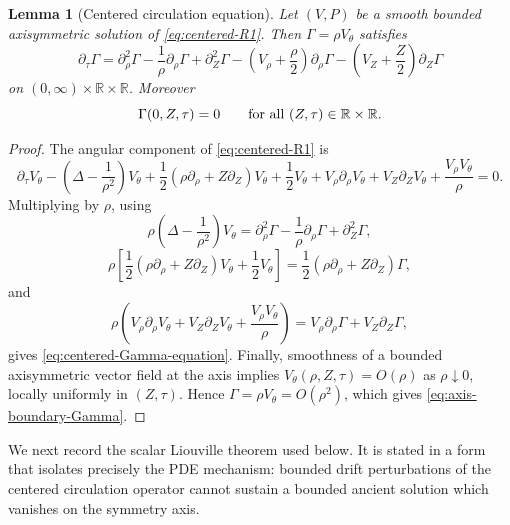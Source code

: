 \documentclass[11pt]{amsart}
\numberwithin{equation}{section}
\theoremstyle{plain}
\newtheorem{lemma}[lemma]{Lemma}
\theoremstyle{definition}
\theoremstyle{remark}
\begin{document}
\begin{lemma}[Centered circulation equation]\label{lem:centered-circulation-equation}
Let \((V,P)\) be a smooth bounded axisymmetric solution of
\eqref{eq:centered-R1}.  Then \(\Gamma=\rho V_\theta\) satisfies
\begin{equation}\label{eq:centered-Gamma-equation}
   \partial_\tau\Gamma
   =
   \partial_\rho^2\Gamma-\frac1\rho\partial_\rho\Gamma
      +\partial_Z^2\Gamma
   -\left(V_\rho+\frac\rho2\right)\partial_\rho\Gamma
   -\left(V_Z+\frac Z2\right)\partial_Z\Gamma
\end{equation}
on \((0,\infty)\times\mathbb R\times\mathbb R\).  Moreover
\begin{equation}\label{eq:axis-boundary-Gamma}
   \Gamma(0,Z,\tau)=0
   \qquad\hbox{for all }(Z,\tau)\in\mathbb R\times\mathbb R .
\end{equation}
\end{lemma}

\begin{proof}
The angular component of \eqref{eq:centered-R1} is
\[
   \partial_\tau V_\theta
   -\left(\Delta-\frac1{\rho^2}\right)V_\theta
   +\frac12(\rho\partial_\rho+Z\partial_Z)V_\theta
   +\frac12V_\theta
   +V_\rho\partial_\rho V_\theta+V_Z\partial_ZV_\theta
   +\frac{V_\rho V_\theta}{\rho}=0 .
\]
Multiplying by \(\rho\), using
\[
   \rho\left(\Delta-\frac1{\rho^2}\right)V_\theta
   =\partial_\rho^2\Gamma-\frac1\rho\partial_\rho\Gamma+
      \partial_Z^2\Gamma,
\]
\[
   \rho\left[\frac12(\rho\partial_\rho+Z\partial_Z)V_\theta
      +\frac12V_\theta\right]
   =\frac12(\rho\partial_\rho+Z\partial_Z)\Gamma,
\]
and
\[
   \rho\left(V_\rho\partial_\rho V_\theta+V_Z\partial_ZV_\theta
      +\frac{V_\rho V_\theta}{\rho}\right)
   =V_\rho\partial_\rho\Gamma+V_Z\partial_Z\Gamma,
\]
gives \eqref{eq:centered-Gamma-equation}.  Finally, smoothness of a bounded
axisymmetric vector field at the axis implies \(V_\theta(\rho,Z,\tau)=O(\rho)\)
as \(\rho\downarrow0\), locally uniformly in \((Z,\tau)\).  Hence
\(\Gamma=\rho V_\theta=O(\rho^2)\), which gives
\eqref{eq:axis-boundary-Gamma}.
\end{proof}

We next record the scalar Liouville theorem used below.  It is stated in a
form that isolates precisely the PDE mechanism: bounded drift perturbations of
the centered circulation operator cannot sustain a bounded ancient solution
which vanishes on the symmetry axis.
\end{document}
